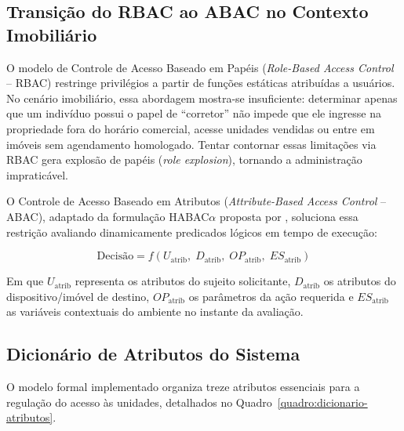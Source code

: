 \subsection{Transição do RBAC ao ABAC no Contexto Imobiliário}
\label{subsec:rbac-vs-abac}

O modelo de Controle de Acesso Baseado em Papéis (\textit{Role-Based Access Control} -- RBAC) restringe privilégios a partir de funções estáticas atribuídas a usuários. No cenário imobiliário, essa abordagem mostra-se insuficiente: determinar apenas que um indivíduo possui o papel de ``corretor'' não impede que ele ingresse na propriedade fora do horário comercial, acesse unidades vendidas ou entre em imóveis sem agendamento homologado. Tentar contornar essas limitações via RBAC gera explosão de papéis (\textit{role explosion}), tornando a administração impraticável.

O Controle de Acesso Baseado em Atributos (\textit{Attribute-Based Access Control} -- ABAC), adaptado da formulação HABAC$\alpha$ proposta por , soluciona essa restrição avaliando dinamicamente predicados lógicos em tempo de execução:

\begin{equation}
\label{eq:abac-decisao}
\text{Decisão} = f(U_{\text{atrib}},\; D_{\text{atrib}},\; OP_{\text{atrib}},\; ES_{\text{atrib}})
\end{equation}

Em que $U_{\text{atrib}}$ representa os atributos do sujeito solicitante, $D_{\text{atrib}}$ os atributos do dispositivo/imóvel de destino, $OP_{\text{atrib}}$ os parâmetros da ação requerida e $ES_{\text{atrib}}$ as variáveis contextuais do ambiente no instante da avaliação.

\subsection{Dicionário de Atributos do Sistema}
\label{subsec:dicionario-atributos}

O modelo formal implementado organiza treze atributos essenciais para a regulação do acesso às unidades, detalhados no Quadro~\ref{quadro:dicionario-atributos}.

